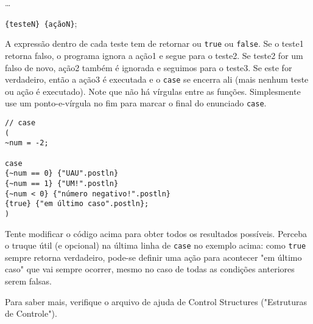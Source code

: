 \dots

\texttt{\{testeN\} \{açãoN\}};

A expressão dentro de cada teste tem de retornar ou \texttt{true} ou \texttt{false}. Se o teste1 retorna falso, o programa ignora a ação1 e segue para o teste2. Se teste2 for um falso de novo, ação2 também é ignorada e seguimos para o teste3. Se este for verdadeiro, então a ação3 é executada e o \texttt{case} se encerra ali (mais nenhum teste ou ação é executado). Note que não há vírgulas entre as funções. Simplesmente use um ponto-e-vírgula no fim para marcar o final do enunciado \texttt{case}.

 
\begin{lstlisting}[style=SuperCollider-IDE, basicstyle=\scttfamily\footnotesize]
// case
(
~num = -2;

case
{~num == 0} {"UAU".postln}
{~num == 1} {"UM!".postln}
{~num < 0} {"número negativo!".postln}
{true} {"em último caso".postln};
)
\end{lstlisting}
 
Tente modificar o código acima para obter todos os resultados possíveis. Perceba o truque útil (e opcional) na última linha de \texttt{case} no exemplo acima: como \texttt{true} sempre retorna verdadeiro, pode-se definir uma ação para acontecer "em último caso" que vai sempre ocorrer, mesmo no caso de todas as condições anteriores serem falsas.

Para saber mais, verifique o arquivo de ajuda de Control Structures ("Estruturas de Controle").
